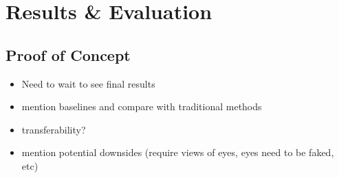 \chapter{Results \& Evaluation}
\label{ch:evaluation}

\section{Proof of Concept}
\label{sec:concept-results}

\begin{itemize}
    \item Need to wait to see final results
    \item mention baselines and compare with traditional methods
    \item transferability?
    \item mention potential downsides (require views of eyes, eyes need to be faked, etc)
\end{itemize}
